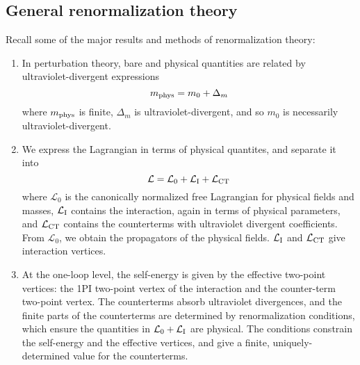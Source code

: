 \subsection{General renormalization theory}
Recall some of the major results and methods of renormalization theory:
\begin{enumerate}
\item In perturbation theory, bare and physical quantities are related by ultraviolet-divergent expressions
\[m_{\rm phys} = m_0 + \Delta_m\]
where $m_{\rm phys}$ is finite, $\Delta_m$ is ultraviolet-divergent, and so $m_0$ is necessarily ultraviolet-divergent.
\item We express the Lagrangian in terms of physical quantites, and separate it into
\[\mathcal{L} = \mathcal{L}_0 + \mathcal{L}_{\rm I} + \mathcal{L}_{\rm CT}\]
where $\mathcal{L}_0$ is the canonically normalized free Lagrangian for physical fields and masses, $\mathcal{L}_{\rm I}$ contains the interaction, again in terms of physical parameters, and $\mathcal{L}_{\rm CT}$ contains the counterterms with ultraviolet divergent coefficients. From $\mathcal{L}_0$, we obtain the propagators of the physical fields. $\mathcal{L}_{\rm I}$ and $\mathcal{L}_{\rm CT}$ give
interaction vertices.
\item At the one-loop level, the self-energy is given by the effective two-point vertices: the 1PI two-point vertex of the interaction and the counter-term two-point vertex. The counterterms absorb ultraviolet divergences, and the finite parts of the counterterms are determined by renormalization conditions,
which ensure the quantities in $\mathcal{L}_0 + \mathcal{L}_{\rm I}$ are physical. The conditions constrain the self-energy and the effective vertices, and give a finite, uniquely-determined value for the counterterms.
\end{enumerate}
